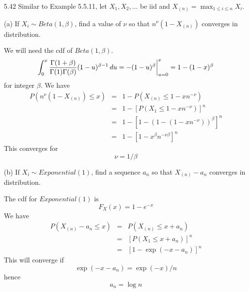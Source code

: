 \documentclass[12pt]{article}
\begin{document}
5.42
Similar to Example 5.5.11, let $X_1,X_2,\ldots$ be iid and
$X_{(n)}=\max_{1\le i\le n}X_i$.

\bigskip
\noindent
(a) If $X_i\sim Beta(1,\beta)$, find a value of $\nu$ so that
$n^\nu (1-X_{(n)})$ converges in distribution.

\bigskip
\noindent
We will need the cdf of $Beta(1,\beta)$.
$$\int_0^x{\Gamma(1+\beta)\over\Gamma(1)\Gamma(\beta)}
(1-u)^{\beta-1}\,du=-(1-u)^\beta\bigg|_{u=0}^x=1-(1-x)^\beta$$
for integer $\beta$. We have
\begin{eqnarray*}
P(n^\nu(1-X_{(n)})\le x)&=&1-P(X_{(n)}\le1-xn^{-\nu})\\
&=&1-[P(X_1\le1-xn^{-\nu})]^n\\
&=&1-[1-(1-(1-xn^{-\nu}))^\beta]^n\\
&=&1-[1-x^\beta n^{-\nu\beta}]^n
\end{eqnarray*}
This converges for
$$\nu=1/\beta$$

\bigskip
\noindent
(b) If $X_i\sim Exponential(1)$, find a sequence $a_n$ so that
$X_{(n)}-a_n$ converges in distribution.

\bigskip
\noindent
The cdf for $Exponential(1)$ is
$$F_X(x)=1-e^{-x}$$
We have
\begin{eqnarray*}
P(X_{(n)}-a_n\le x)&=&P(X_{(n)}\le x+a_n)\\
&=&[P(X_1\le x+a_n)]^n\\
&=&[1-\exp(-x-a_n)]^n
\end{eqnarray*}
This will converge if
$$\exp(-x-a_n)=\exp(-x)/n$$
hence
$$a_n=\log n$$
\end{document}

